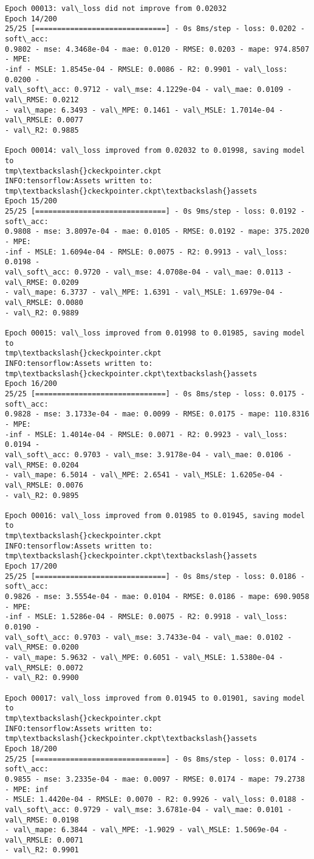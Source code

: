 \documentclass[11pt]{article}
\begin{document}
\begin{Verbatim}[commandchars=\\\{\}]
Epoch 00013: val\_loss did not improve from 0.02032
Epoch 14/200
25/25 [==============================] - 0s 8ms/step - loss: 0.0202 - soft\_acc:
0.9802 - mse: 4.3468e-04 - mae: 0.0120 - RMSE: 0.0203 - mape: 974.8507 - MPE:
-inf - MSLE: 1.8545e-04 - RMSLE: 0.0086 - R2: 0.9901 - val\_loss: 0.0200 -
val\_soft\_acc: 0.9712 - val\_mse: 4.1229e-04 - val\_mae: 0.0109 - val\_RMSE: 0.0212
- val\_mape: 6.3493 - val\_MPE: 0.1461 - val\_MSLE: 1.7014e-04 - val\_RMSLE: 0.0077
- val\_R2: 0.9885

Epoch 00014: val\_loss improved from 0.02032 to 0.01998, saving model to
tmp\textbackslash{}ckeckpointer.ckpt
INFO:tensorflow:Assets written to: tmp\textbackslash{}ckeckpointer.ckpt\textbackslash{}assets
Epoch 15/200
25/25 [==============================] - 0s 9ms/step - loss: 0.0192 - soft\_acc:
0.9808 - mse: 3.8097e-04 - mae: 0.0105 - RMSE: 0.0192 - mape: 375.2020 - MPE:
-inf - MSLE: 1.6094e-04 - RMSLE: 0.0075 - R2: 0.9913 - val\_loss: 0.0198 -
val\_soft\_acc: 0.9720 - val\_mse: 4.0708e-04 - val\_mae: 0.0113 - val\_RMSE: 0.0209
- val\_mape: 6.3737 - val\_MPE: 1.6391 - val\_MSLE: 1.6979e-04 - val\_RMSLE: 0.0080
- val\_R2: 0.9889

Epoch 00015: val\_loss improved from 0.01998 to 0.01985, saving model to
tmp\textbackslash{}ckeckpointer.ckpt
INFO:tensorflow:Assets written to: tmp\textbackslash{}ckeckpointer.ckpt\textbackslash{}assets
Epoch 16/200
25/25 [==============================] - 0s 8ms/step - loss: 0.0175 - soft\_acc:
0.9828 - mse: 3.1733e-04 - mae: 0.0099 - RMSE: 0.0175 - mape: 110.8316 - MPE:
-inf - MSLE: 1.4014e-04 - RMSLE: 0.0071 - R2: 0.9923 - val\_loss: 0.0194 -
val\_soft\_acc: 0.9703 - val\_mse: 3.9178e-04 - val\_mae: 0.0106 - val\_RMSE: 0.0204
- val\_mape: 6.5014 - val\_MPE: 2.6541 - val\_MSLE: 1.6205e-04 - val\_RMSLE: 0.0076
- val\_R2: 0.9895

Epoch 00016: val\_loss improved from 0.01985 to 0.01945, saving model to
tmp\textbackslash{}ckeckpointer.ckpt
INFO:tensorflow:Assets written to: tmp\textbackslash{}ckeckpointer.ckpt\textbackslash{}assets
Epoch 17/200
25/25 [==============================] - 0s 8ms/step - loss: 0.0186 - soft\_acc:
0.9826 - mse: 3.5554e-04 - mae: 0.0104 - RMSE: 0.0186 - mape: 690.9058 - MPE:
-inf - MSLE: 1.5286e-04 - RMSLE: 0.0075 - R2: 0.9918 - val\_loss: 0.0190 -
val\_soft\_acc: 0.9703 - val\_mse: 3.7433e-04 - val\_mae: 0.0102 - val\_RMSE: 0.0200
- val\_mape: 5.9632 - val\_MPE: 0.6051 - val\_MSLE: 1.5380e-04 - val\_RMSLE: 0.0072
- val\_R2: 0.9900

Epoch 00017: val\_loss improved from 0.01945 to 0.01901, saving model to
tmp\textbackslash{}ckeckpointer.ckpt
INFO:tensorflow:Assets written to: tmp\textbackslash{}ckeckpointer.ckpt\textbackslash{}assets
Epoch 18/200
25/25 [==============================] - 0s 8ms/step - loss: 0.0174 - soft\_acc:
0.9855 - mse: 3.2335e-04 - mae: 0.0097 - RMSE: 0.0174 - mape: 79.2738 - MPE: inf
- MSLE: 1.4420e-04 - RMSLE: 0.0070 - R2: 0.9926 - val\_loss: 0.0188 -
val\_soft\_acc: 0.9729 - val\_mse: 3.6781e-04 - val\_mae: 0.0101 - val\_RMSE: 0.0198
- val\_mape: 6.3844 - val\_MPE: -1.9029 - val\_MSLE: 1.5069e-04 - val\_RMSLE: 0.0071
- val\_R2: 0.9901


\end{Verbatim}
\end{document}
